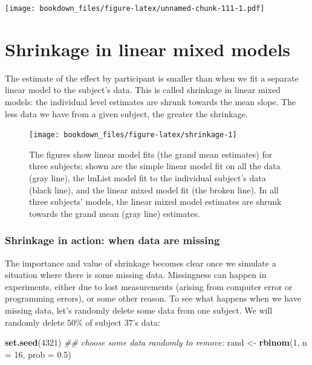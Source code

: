 \documentclass[12pt,]{krantz}
\newenvironment{Shaded}{\begin{snugshade}}{\end{snugshade}}
\newcommand{\CommentTok}[1]{\textcolor[rgb]{0.56,0.35,0.01}{\textit{#1}}}
\newcommand{\DataTypeTok}[1]{\textcolor[rgb]{0.13,0.29,0.53}{#1}}
\newcommand{\DecValTok}[1]{\textcolor[rgb]{0.00,0.00,0.81}{#1}}
\newcommand{\FloatTok}[1]{\textcolor[rgb]{0.00,0.00,0.81}{#1}}
\newcommand{\KeywordTok}[1]{\textcolor[rgb]{0.13,0.29,0.53}{\textbf{#1}}}
\newcommand{\NormalTok}[1]{#1}
\newcommand{\StringTok}[1]{\textcolor[rgb]{0.31,0.60,0.02}{#1}}
\begin{document}
\texttt{[image: bookdown\_files/figure-latex/unnamed-chunk-111-1.pdf]}

\hypertarget{shrinkage-in-linear-mixed-models}{%
\section{Shrinkage in linear mixed models}\label{shrinkage-in-linear-mixed-models}}

The estimate of the effect by participant is smaller than when we fit a separate linear model to the subject's data.
This is called shrinkage in linear mixed models: the individual level estimates are shrunk towards the mean slope.
The less data we have from a given subject, the greater the shrinkage.

\begin{figure}
\texttt{[image: bookdown\_files/figure-latex/shrinkage-1]} \caption{The figures show linear model fits (the grand mean estimates) for three subjects; shown are the simple linear model fit on all the data (gray line), the lmList model fit to the individual subject's data (black line), and the linear mixed model fit (the broken line). In all three subjects' models, the linear mixed model estimates are shrunk towards the grand mean (gray line) estimates.}\label{fig:shrinkage}
\end{figure}

\hypertarget{shrinkage-in-action-when-data-are-missing}{%
\subsubsection{Shrinkage in action: when data are missing}\label{shrinkage-in-action-when-data-are-missing}}

The importance and value of shrinkage becomes clear once we simulate a situation where there is some missing data. Missingness can happen in experiments, either due to lost measurements (arising from computer error or programming errors), or some other reason. To see what happens when we have missing data, let's randomly delete some data from one subject. We will randomly delete 50\% of subject 37's data:

\begin{Shaded}
\begin{Highlighting}[]
\KeywordTok{set.seed}\NormalTok{(}\DecValTok{4321}\NormalTok{)}
\CommentTok{## choose some data randomly to remove:}
\NormalTok{rand <-}\StringTok{ }\KeywordTok{rbinom}\NormalTok{(}\DecValTok{1}\NormalTok{, }\DataTypeTok{n =} \DecValTok{16}\NormalTok{, }\DataTypeTok{prob =} \FloatTok{0.5}\NormalTok{)}
\end{Highlighting}
\end{Shaded}
\end{document}
